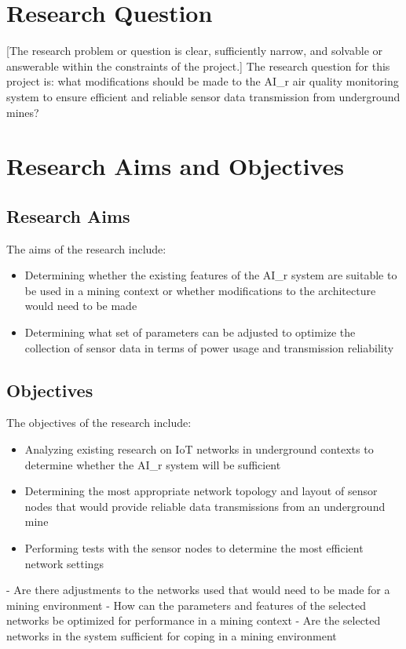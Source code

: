 \documentclass[a4paper,twoside,12pt]{report}
\begin{document}
\section{Research Question}
[The research problem or question is clear, sufficiently narrow, and solvable or answerable
within the constraints of the project.]
\newline \newline
The research question for this project is: what modifications should be made to the AI\_r air quality monitoring system to ensure efficient and reliable sensor data transmission from underground mines?

\section{Research Aims and Objectives}

\subsection{Research Aims}
The aims of the research include:
\begin{itemize}
    \item Determining whether the existing features of the AI\_r system are suitable to be used in a mining context or whether modifications to the architecture would need to be made
    \item Determining what set of parameters can be adjusted to optimize the collection of sensor data in terms of power usage and transmission reliability
\end{itemize}

\subsection{Objectives}
The objectives of the research include:
\begin{itemize}
    \item Analyzing existing research on IoT networks in underground contexts to determine whether the AI\_r system will be sufficient
    \item Determining the most appropriate network topology and layout of sensor nodes that would provide reliable data transmissions from an underground mine
    \item Performing tests with the sensor nodes to determine the most efficient network settings
\end{itemize}

- Are there adjustments to the networks used that would need to be made for a mining environment
- How can the parameters and features of the selected networks be optimized for performance in a mining context
- Are the selected networks in the system sufficient for coping in a mining environment
\end{document}
